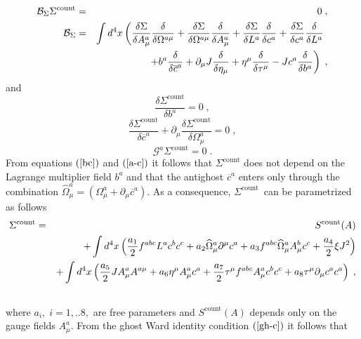 \documentclass[a4paper,12pt]{article}
\begin{document}
\begin{eqnarray}
\mathcal{B}_{\Sigma }\Sigma ^{\mathrm{count}} &=&0\;,  \label{st-c} \\
\mathcal{B}_{\Sigma } &=&\int d^{4}x\left( \frac{\delta \Sigma }{\delta
A_{\mu }^{a}}\frac{\delta }{\delta \Omega ^{a\mu }}+\frac{\delta \Sigma }{%
\delta \Omega ^{a\mu }}\frac{\delta }{\delta A_{\mu }^{a}}+\frac{\delta
\Sigma }{\delta L^{a}}\frac{\delta }{\delta c^{a}}+\frac{\delta \Sigma }{%
\delta c^{a}}\frac{\delta }{\delta L^{a}}\right. \;  \nonumber \\
&&\left. +b^{a}\frac{\delta }{\delta \overline{c}^{a}}+\partial _{\mu }J%
\frac{\delta }{\delta \eta _{\mu }}+\eta ^{\mu }\frac{\delta }{\delta \tau
^{\mu }}-Jc^{a}\frac{\delta }{\delta b^{a}}\right) \;,  \nonumber
\end{eqnarray}
and 
\begin{equation}
\frac{\delta \Sigma ^{\mathrm{count}}}{\delta b^{a}}=0\;,  \label{bc}
\end{equation}
\begin{equation}
\frac{\delta \Sigma ^{\mathrm{count}}}{\delta \overline{c}^{a}}+\partial
_{\mu }\frac{\delta \Sigma ^{\mathrm{count}}}{\delta \Omega _{\mu }^{a}}=0\;,
\label{a-c}
\end{equation}
\begin{equation}
\mathcal{G}^{a}\Sigma ^{\mathrm{count}}=0\;.  \label{gh-c}
\end{equation}
From equations $\left( \ref{bc}\right) $ and $\left( \ref{a-c}\right) $ it
follows that $\Sigma ^{\mathrm{count}}$ does not depend on the Lagrange
multiplier field $b^{a}$ and that the antighost $\overline{c}^{a}$ enters
only through the combination $\widehat{\Omega }_{\mu }^{a}=\left( \Omega
_{\mu }^{a}+\partial _{\mu }\overline{c}^{a}\right) $. As a consequence, $%
\Sigma ^{\mathrm{count}}$\ can be parametrized as follows 
\begin{eqnarray}
\Sigma ^{\mathrm{count}} &=&S^{\mathrm{count}}(A)  \nonumber \\
&&+\int d^{4}x\left( \frac{a_{1}}{2}f^{abc}L^{a}c^{b}c^{c}+a_{2}\widehat{%
\Omega }_{\mu }^{a}\partial ^{\mu }c^{a}+a_{3}f^{abc}\widehat{\Omega }_{\mu
}^{a}A_{\mu }^{b}c^{c}+\frac{a_{4}}{2}\xi J^{2}\right)  \nonumber \\
&&+\int d^{4}x\left( \frac{a_{5}}{2}JA_{\mu }^{a}A^{a\mu }+a_{6}\eta ^{\mu
}A_{\mu }^{a}c^{a}+\frac{a_{7}}{2}\tau ^{\mu }f^{abc}A_{\mu
}^{a}c^{b}c^{c}+a_{8}\tau ^{\mu }\partial _{\mu }c^{a}c^{a}\right) \;, 
\nonumber \\
&&  \label{ct1}
\end{eqnarray}
where $a_{i},\;i=1,..8,$ are free parameters and $S^{\mathrm{count}}(A)$
depends only on the gauge fields $A_{\mu }^{a}$. From the ghost Ward
identity condition $\left( \ref{gh-c}\right) $ it follows that
\end{document}

